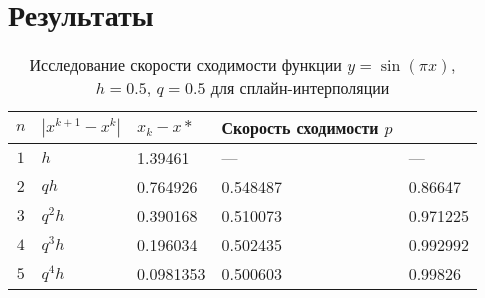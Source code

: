 \documentclass{article}
\begin{document}
    \section{Результаты}
    \begin{table}[H]
        \centering
        \caption{Исследование скорости сходимости функции $y = \sin(\pi x)$, $h = 0.5$, $q = 0.5$ для сплайн-интерполяции}
        \begin{tabular}{|c|p{3cm}|p{3cm}|p{3cm}|p{3cm}|}
            \hline
            $n$ & $|x^{k+1} - x^k|$ & $ x_k - x*$ & Скорость сходимости $p$ \\
            \hline 
            $1$ & $h$ & 1.39461 & --- & --- \\
            \hline 
            $2$ & $qh$ &0.764926 & 0.548487 & 0.86647\\
            \hline 
            $3$ & $q^2 h$ & 0.390168& 0.510073& 0.971225\\
            \hline 
            $4$ & $q^3 h$ &  0.196034&0.502435 &0.992992\\
            \hline 
            $5$ & $q^4 h$ &  0.0981353&0.500603 & 0.99826\\
            \hline 
        \end{tabular}
    \end{table}
\end{document}
